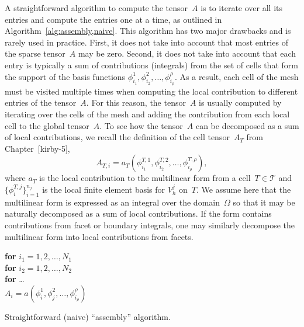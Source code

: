 A straightforward algorithm to compute the tensor~$A$ is to iterate
over all its entries and compute the entries one at a time, as
outlined in Algorithm~\ref{alg:assembly,naive}.  This algorithm has
two major drawbacks and is rarely used in practice. First, it does not
take into account that most entries of the sparse tensor~$A$ may be
zero. Second, it does not take into account that each entry is
typically a sum of contributions (integrals) from the set of cells
that form the support of the basis functions
$\phi^1_{i_1}, \phi^2_{i_2}, \ldots,
\phi^{\rho}_{i_\rho}$. As a result, each cell of the mesh must be
visited multiple times when computing the local contribution to
different entries of the tensor~$A$.  For this reason, the tensor~$A$
is usually computed by iterating over the cells of the mesh and adding
the contribution from each local cell to the global tensor~$A$. To see
how the tensor~$A$ can be decomposed as a sum of local contributions,
we recall the definition of the cell tensor~$A_T$ from
Chapter~[kirby-5],
\begin{displaymath}
  A_{T,i} = a_T(\phi^{T,1}_{i_1}, \phi^{T,2}_{i_2}, \ldots, \phi^{T,\rho}_{i_{\rho}}),
\end{displaymath}
where $a_T$ is the local contribution to the multilinear form from a
cell~$T\in\mathcal{T}$ and $\{\phi^{T,j}_i\}_{i=1}^{n_j}$ is the local
finite element basis for $V^j_h$ on~$T$. We assume here that the
multilinear form is expressed as an integral over the domain~$\Omega$
so that it may be naturally decomposed as a sum of local
contributions. If the form contains contributions from facet or
boundary integrals, one may similarly decompose the multilinear form
into local contributions from facets.

\begin{algorithm}
  \begin{tabbing}
    \textbf{for} {$i_1 = 1,2,\ldots,N_1$}\\
    \tab \textbf{for} {$i_2 = 1,2,\ldots,N_2$}\\
    \tab \tab \textbf{for} \ldots \\
    \tab \tab \tab $A_i = a(\phi^1_i, \phi^2_j, \ldots, \phi^{\rho}_{i_{\rho}})$
  \end{tabbing}
  \caption{Straightforward (naive) ``assembly'' algorithm.}
  \label{alg:assembly,naive}
\end{algorithm}

